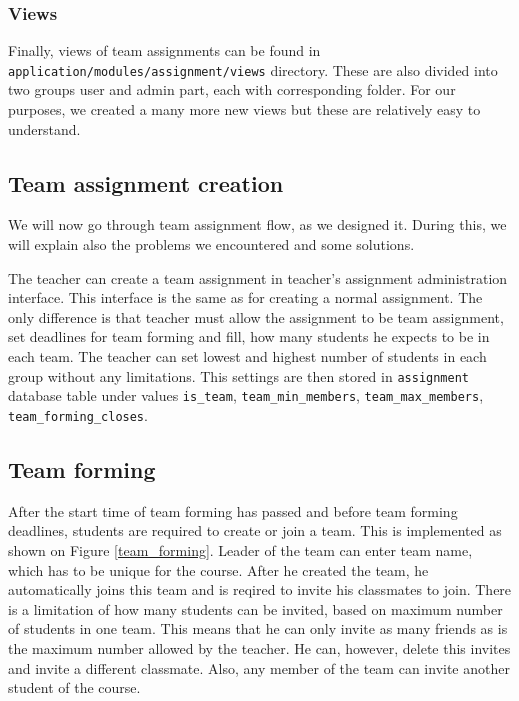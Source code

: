 \subsubsection{Views}
Finally, views of team assignments can be found in \\ \texttt{application/modules/assignment/views} directory. These are also divided into two groups user and admin part, each with corresponding folder. For our purposes, we created a many more new views but these are relatively easy to understand.

\subsection{Team assignment creation}
We will now go through team assignment flow, as we designed it. During this, we will explain also the problems we encountered and some solutions.

The teacher can create a team assignment in teacher's assignment administration interface. This interface is the same as for creating a normal assignment. The only difference is that teacher must allow the assignment to be team assignment, set deadlines for team forming and fill, how many students he expects to be in each team. The teacher can set lowest and highest number of students in each group without any limitations. This settings are then stored in \texttt{assignment} database table under values \texttt{is\_team}, \texttt{team\_min\_members}, \texttt{team\_max\_members}, \texttt{team\_forming\_closes}.

\subsection{Team forming}
After the start time of team forming has passed and before team forming deadlines, students are required to create or join a team. This is implemented as shown on Figure \ref{team_forming}. Leader of the team can enter team name, which has to be unique for the course. After he created the team, he automatically joins this team and is reqired to invite his classmates to join. There is a limitation of how many students can be invited, based on maximum number of students in one team. This means that he can only invite as many friends as is the maximum number allowed by the teacher. He can, however, delete this invites and invite a different classmate. Also, any member of the team can invite another student of the course.


